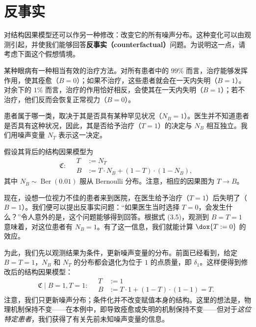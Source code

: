 \section{反事实}
\label{sec:ch03-counterfactuals}

对结构因果模型还可以作另一种修改：改变它的所有噪声分布。这种变化可以由观测引起，并使我们能够回答\textbf{反事实（counterfactual）}问题。为说明这一点，请考虑下面这个假想情境。

\begin{example}[眼病]
某种眼病有一种相当有效的治疗方法。对所有患者中的 $99\%$ 而言，治疗能够发挥作用，使其痊愈（$B=0$）；如果不治疗，这些患者就会在一天内失明（$B=1$）。对余下的 $1\%$ 而言，治疗的作用恰好相反，会使其在一天内失明（$B=1$）；若不治疗，他们反而会恢复正常视力（$B=0$）。

患者属于哪一类，取决于其是否具有某种罕见状况（$N_B=1$）。医生并不知道患者是否具有这种状况，因此，其是否给予治疗（$T=1$）的决定与 $N_B$ 相互独立。我们用噪声变量 $N_T$ 表示这一决定。

假设其背后的结构因果模型为
\begin{equation}
 \mathfrak{C}:\quad
 \begin{aligned}
 T&:=N_T\\
 B&:=T\cdot N_B+(1-T)\cdot(1-N_B),
 \end{aligned}
 \tag{3.5}
\end{equation}
其中 $N_B\sim\operatorname{Ber}(0.01)$ 服从 Bernoulli 分布。注意，相应的因果图为 $T\to B$。

现在，设想一位视力不佳的患者来到医院，在医生给予治疗（$T=1$）后失明了（$B=1$）。我们便可以提出反事实问题：“如果医生当时选择 $T=0$，会发生什么？”令人意外的是，这个问题能够得到回答。根据式 (3.5)，观测到 $B=T=1$ 意味着，对这位患者有 $N_B=1$。有了这一信息，我们就能计算 $\dox{T:=0}$ 的效应。

为此，我们先以观测结果为条件，更新噪声变量的分布。前面已经看到，给定 $B=T=1$，$N_B$ 和 $N_T$ 的分布都会退化为位于 $1$ 的点质量，即 $\delta_1$。这样便得到修改后的结构因果模型：
\begin{equation}
 \mathfrak{C}\mid B=1,T=1:\quad
 \begin{aligned}
 T&:=1\\
 B&:=T\cdot1+(1-T)\cdot(1-1)=T.
 \end{aligned}
 \tag{3.6}
\end{equation}
注意，我们只更新噪声分布；条件化并不改变赋值本身的结构。这里的想法是，物理机制保持不变——在本例中，即导致痊愈或失明的机制保持不变——但对于\emph{这位特定患者}，我们获得了有关先前未知噪声变量的信息。


\end{example}
